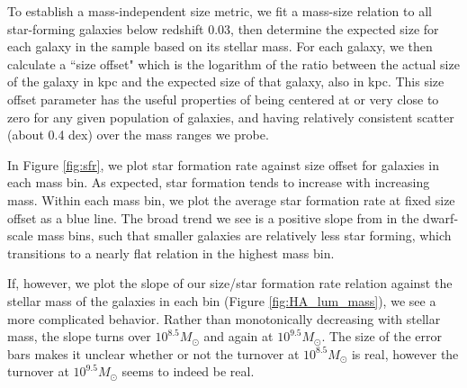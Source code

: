 \documentclass[iop]{emulateapj}
\begin{document}
To establish a mass-independent size metric, we fit a mass-size relation to all star-forming galaxies below redshift 0.03, then determine the expected size for each galaxy in the sample based on its stellar mass. For each galaxy, we then calculate a ``size offset" which is the logarithm of the ratio between the actual size of the galaxy in kpc and the expected size of that galaxy, also in kpc. This size offset parameter has the useful properties of being centered at or very close to zero for any given population of galaxies, and having relatively consistent scatter (about 0.4 dex) over the mass ranges we probe.


In Figure \ref{fig:sfr}, we plot star formation rate against size offset for galaxies in each mass bin. As expected, star formation tends to increase with increasing mass. Within each mass bin, we plot the average star formation rate at fixed size offset as a blue line. The broad trend we see is a positive slope from in the dwarf-scale mass bins, such that smaller galaxies are relatively less star forming, which transitions to a nearly flat relation in the highest mass bin.

If, however, we plot the slope of our size/star formation rate relation against the stellar mass of the galaxies in each bin (Figure \ref{fig:HA_lum_mass}), we see a more complicated behavior. Rather than monotonically decreasing with stellar mass, the slope turns over $10^{8.5} M_{\odot}$  and again at $10^{9.5} M_{\odot}$. The size of the error bars makes it unclear whether or not the turnover at $10^{8.5} M_{\odot}$ is real, however the turnover at $10^{9.5} M_{\odot}$ seems to indeed be real.
\end{document}
